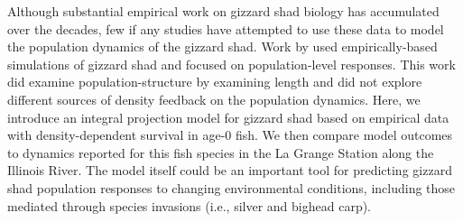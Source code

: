 \documentclass[preprint,review,12pt,authoryear]{elsarticle}
\begin{document}


Although substantial empirical work on gizzard shad biology has accumulated over the decades, few if any studies have attempted to use these data to model the population dynamics of the gizzard shad.
Work by \citet{catalano2010size, catalano2011whole} used empirically-based simulations of gizzard shad and focused on population-level responses.
This work did examine population-structure by examining length and did
not explore different sources of density feedback on the population
dynamics.
Here, we introduce an integral projection model for gizzard shad based on empirical data with density-dependent survival in age-0 fish.
We then compare model outcomes to dynamics reported for this fish species in the La Grange Station along the Illinois River.
The model itself could be an important tool for predicting gizzard shad population responses to changing environmental conditions, including those mediated through species invasions (i.e., silver and bighead carp).
\end{document}
